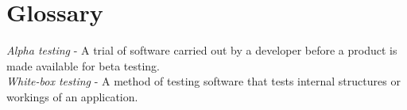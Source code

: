 \documentclass{scrreprt}
\begin{document}
	{\let\clearpage\relax \chapter{Glossary}}
	\textit{Alpha testing} - A trial of software carried out by a developer before a product is made available for beta testing.\\
	
	\textit{White-box testing} - A method of testing software that tests internal structures or workings of an application. 
\end{document}
